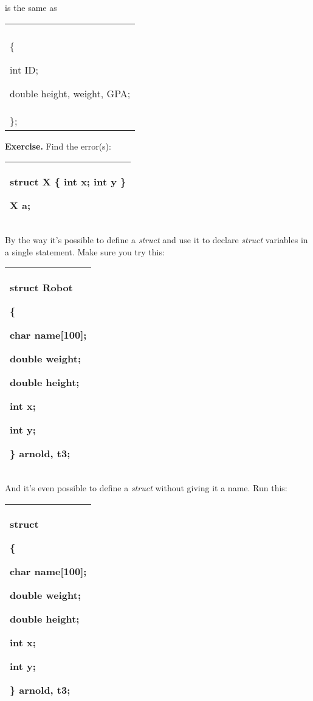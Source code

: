 \documentclass[
]{article}
\begin{document}
is the same as

\begin{longtable}[]{@{}l@{}}
\toprule
\endhead
\begin{minipage}[t]{0.97\columnwidth}\raggedright
struct Student\\
\{

int ID;

double height, weight, GPA;\\
\};\strut
\end{minipage}\tabularnewline
\bottomrule
\end{longtable}

\textbf{Exercise.} Find the error(s):

\begin{longtable}[]{@{}l@{}}
\toprule
\endhead
\begin{minipage}[t]{0.97\columnwidth}\raggedright
struct X \{ int x; int y \}

X a;\strut
\end{minipage}\tabularnewline
\bottomrule
\end{longtable}

By the way it's possible to define a \emph{struct} and use it to declare
\emph{struct} variables in a single statement. Make sure you try this:

\begin{longtable}[]{@{}l@{}}
\toprule
\endhead
\begin{minipage}[t]{0.97\columnwidth}\raggedright
struct Robot

\{

char name{[}100{]};

double weight;

double height;

int x;

int y;

\} arnold, t3;\strut
\end{minipage}\tabularnewline
\bottomrule
\end{longtable}

And it's even possible to define a \emph{struct} without giving it a
name. Run this:

\begin{longtable}[]{@{}l@{}}
\toprule
\endhead
\begin{minipage}[t]{0.97\columnwidth}\raggedright
struct

\{

char name{[}100{]};

double weight;

double height;

int x;

int y;

\} arnold, t3;\strut
\end{minipage}\tabularnewline
\bottomrule
\end{longtable}
\end{document}
